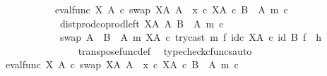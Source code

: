 \begin{isabellebody}
\ \ \ \ \ \ \ \ \ \ {\isacharequal}{\kern0pt}\ {\isacharparenleft}{\kern0pt}{\isacharparenleft}{\kern0pt}eval{\isacharunderscore}{\kern0pt}func\ X\ A\ {\isasymcirc}\isactrlsub c\ swap\ {\isacharparenleft}{\kern0pt}X\isactrlbsup A\isactrlesup {\isacharparenright}{\kern0pt}\ A{\isacharparenright}{\kern0pt}\ {\isasymamalg}\ {\isacharparenleft}{\kern0pt}x\ {\isasymcirc}\isactrlsub c\ {\isasymbeta}\isactrlbsub X\isactrlbsup A\isactrlesup \ {\isasymtimes}\isactrlsub c\ {\isacharparenleft}{\kern0pt}B\ {\isasymsetminus}\ {\isacharparenleft}{\kern0pt}A{\isacharcomma}{\kern0pt}\ m{\isacharparenright}{\kern0pt}{\isacharparenright}{\kern0pt}\isactrlesub {\isacharparenright}{\kern0pt}\ {\isasymcirc}\isactrlsub c\isanewline
\ \ \ \ \ \ \ \ \ \ \ \ dist{\isacharunderscore}{\kern0pt}prod{\isacharunderscore}{\kern0pt}coprod{\isacharunderscore}{\kern0pt}left\ {\isacharparenleft}{\kern0pt}X\isactrlbsup A\isactrlesup {\isacharparenright}{\kern0pt}\ A\ {\isacharparenleft}{\kern0pt}B\ {\isasymsetminus}\ {\isacharparenleft}{\kern0pt}A{\isacharcomma}{\kern0pt}\ m{\isacharparenright}{\kern0pt}{\isacharparenright}{\kern0pt}\ {\isasymcirc}\isactrlsub c\isanewline
\ \ \ \ \ \ \ \ \ \ \ \ swap\ {\isacharparenleft}{\kern0pt}A\ {\isasymCoprod}\ {\isacharparenleft}{\kern0pt}B\ {\isasymsetminus}\ {\isacharparenleft}{\kern0pt}A{\isacharcomma}{\kern0pt}\ m{\isacharparenright}{\kern0pt}{\isacharparenright}{\kern0pt}{\isacharparenright}{\kern0pt}\ {\isacharparenleft}{\kern0pt}X\isactrlbsup A\isactrlesup {\isacharparenright}{\kern0pt}\ {\isasymcirc}\isactrlsub c\ try{\isacharunderscore}{\kern0pt}cast\ m\ {\isasymtimes}\isactrlsub f\ id\isactrlsub c\ {\isacharparenleft}{\kern0pt}X\isactrlbsup A\isactrlesup {\isacharparenright}{\kern0pt}{\isacharparenright}{\kern0pt}\ {\isasymcirc}\isactrlsub c\ {\isacharparenleft}{\kern0pt}id\ B\ {\isasymtimes}\isactrlsub f\ \ h{\isacharparenright}{\kern0pt}{\isachardoublequoteclose}\isanewline
\ \ \ \ \ \ \ \ \ \ \ \ \isamarkupfalse%
\ \ \ transpose{\isacharunderscore}{\kern0pt}func{\isacharunderscore}{\kern0pt}def\ \isamarkupfalse%
\ {\isacharparenleft}{\kern0pt}typecheck{\isacharunderscore}{\kern0pt}cfuncs{\isacharcomma}{\kern0pt}auto{\isacharparenright}{\kern0pt}\isanewline
\ \ \ \ \ \ \ \ \ \ \isamarkupfalse%
\ \isamarkupfalse%
\ {\isachardoublequoteopen}{\isacharparenleft}{\kern0pt}{\isacharparenleft}{\kern0pt}{\isacharparenleft}{\kern0pt}eval{\isacharunderscore}{\kern0pt}func\ X\ A\ {\isasymcirc}\isactrlsub c\ swap\ {\isacharparenleft}{\kern0pt}X\isactrlbsup A\isactrlesup {\isacharparenright}{\kern0pt}\ A{\isacharparenright}{\kern0pt}\ {\isasymamalg}\ {\isacharparenleft}{\kern0pt}x\ {\isasymcirc}\isactrlsub c\ {\isasymbeta}\isactrlbsub X\isactrlbsup A\isactrlesup \ {\isasymtimes}\isactrlsub c\ {\isacharparenleft}{\kern0pt}B\ {\isasymsetminus}\ {\isacharparenleft}{\kern0pt}A{\isacharcomma}{\kern0pt}\ m{\isacharparenright}{\kern0pt}{\isacharparenright}{\kern0pt}\isactrlesub {\isacharparenright}{\kern0pt}\ {\isasymcirc}\isactrlsub c\isanewline

\end{isabellebody}
